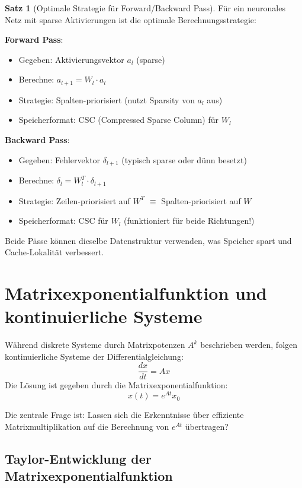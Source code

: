 \documentclass[a4paper,12pt]{report}
\theoremstyle{definition}
\newtheorem{satz}{Satz}
\begin{document}
	\begin{satz}[Optimale Strategie für Forward/Backward Pass]
		Für ein neuronales Netz mit sparse Aktivierungen ist die optimale Berechnungsstrategie:
		
		\textbf{Forward Pass}: 
		\begin{itemize}
			\item Gegeben: Aktivierungsvektor $a_l$ (sparse)
			\item Berechne: $a_{l+1} = W_l \cdot a_l$
			\item Strategie: Spalten-priorisiert (nutzt Sparsity von $a_l$ aus)
			\item Speicherformat: CSC (Compressed Sparse Column) für $W_l$
		\end{itemize}
		
		\textbf{Backward Pass}:
		\begin{itemize}
			\item Gegeben: Fehlervektor $\delta_{l+1}$ (typisch sparse oder dünn besetzt)
			\item Berechne: $\delta_l = W_l^T \cdot \delta_{l+1}$
			\item Strategie: Zeilen-priorisiert auf $W^T$ $\equiv$ Spalten-priorisiert auf $W$
			\item Speicherformat: CSC für $W_l$ (funktioniert für beide Richtungen!)
		\end{itemize}
		
		Beide Pässe können dieselbe Datenstruktur verwenden, was Speicher spart und Cache-Lokalität verbessert.
	\end{satz}
	
	\chapter{Matrixexponentialfunktion und kontinuierliche Systeme}
	
	Während diskrete Systeme durch Matrixpotenzen $A^k$ beschrieben werden, folgen kontinuierliche Systeme der Differentialgleichung:
	\[
	\frac{dx}{dt} = A x
	\]
	Die Lösung ist gegeben durch die Matrixexponentialfunktion:
	\[
	x(t) = e^{At} x_0
	\]
	
	Die zentrale Frage ist: Lassen sich die Erkenntnisse über effiziente Matrixmultiplikation auf die Berechnung von $e^{At}$ übertragen?
	
	\section{Taylor-Entwicklung der Matrixexponentialfunktion}
	
\end{document}
